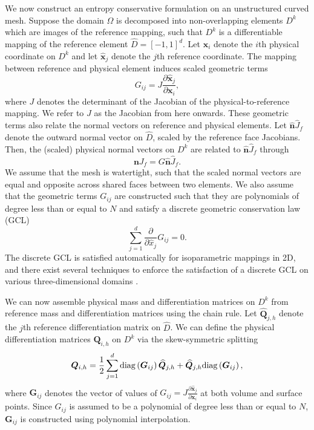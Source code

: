 \documentclass{svjour3}                     %
\renewcommand{\hat}{\widehat}
\newcommand{\diag}[1]{{\rm diag}\LRp{#1}}
\newcommand{\pd}[2]{\frac{\partial#1}{\partial#2}}
\newcommand{\LRp}[1]{\left( #1 \right)}
\begin{document}
We now construct an entropy conservative formulation on an unstructured curved mesh.  
Suppose the domain $\Omega$ is decomposed into non-overlapping elements $D^k$ which are images of the reference mapping, such that $D^k$ is a differentiable mapping of the reference element $\hat{D} = [-1,1]^d$.  Let $\bm{x}_i$ denote the $i$th physical coordinate on $D^k$ and let $\hat{\bm{x}}_j$ denote the $j$th reference coordinate.  The mapping between reference and physical element induces scaled geometric terms 
\[
G_{ij} = J\pd{\hat{\bm{x}}_j}{\bm{x}_i},
\]
where $J$ denotes the determinant of the Jacobian of the physical-to-reference mapping.  We refer to $J$ as the Jacobian from here onwards.
These geometric terms also relate the normal vectors on reference and physical elements.  Let $\hat{\bm{n}}\hat{J}_f$ denote the outward normal vector on $\hat{D}$, scaled by the reference face Jacobians.  Then, the (scaled) physical normal vectors on $D^k$ are related to $\hat{\bm{n}}\hat{J}_f$ through
\begin{equation}
\bm{n}J_f = G\hat{\bm{n}}\hat{J}_f.
\label{eq:nJ_Gnhat}
\end{equation}
We assume that the mesh is watertight, such that the scaled normal vectors are equal and opposite across shared faces between two elements.  We also assume that the geometric terms ${G}_{ij}$ are constructed such that they are polynomials of degree less than or equal to $N$ and satisfy a discrete geometric conservation law (GCL)
\begin{equation}
\sum_{j=1}^d \pd{}{\hat{x}_j} G_{ij} = 0.
\label{eq:dgcl}
\end{equation}
The discrete GCL is satisfied automatically for isoparametric mappings in 2D, and there exist several techniques to enforce the satisfaction of a discrete GCL on various three-dimensional domains \cite{thomas1979geometric, kopriva2006metric, crean2018entropy, chan2018discretely, kozdon2018energy, kopriva2019free}.  

We can now assemble physical mass and differentiation matrices on $D^k$ from reference mass and differentiation matrices using the chain rule.  Let $\hat{\bm{Q}}_{j,h}$ denote the $j$th reference differentiation matrix on $\hat{D}$.  We can define the physical differentiation matrices $\bm{Q}_{i,h}$ on $D^k$ via the skew-symmetric splitting
\begin{equation}
\bm{Q}_{i,h} = \frac{1}{2}\sum_{j=1}^d \diag{\bm{G}_{ij}}\hat{\bm{Q}}_{j,h} + \hat{\bm{Q}}_{j,h} \diag{\bm{G}_{ij}},
\label{eq:curvedQ}
\end{equation}
where $\bm{G}_{ij}$ denotes the vector of values of $G_{ij} = J\pd{\hat{\bm{x}}_j}{\bm{x}_i}$ at both volume and surface points.  Since $G_{ij}$ is assumed to be a polynomial of degree less than or equal to $N$, $\bm{G}_{ij}$ is constructed using polynomial interpolation.
\end{document}
